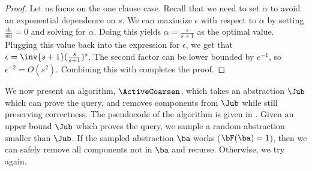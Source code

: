 \begin{proof}
Let us focus on the one clause case.
Recall that we need to set $\alpha$ to avoid an exponential dependence on $s$.
We can maximize $\epsilon$ with respect to $\alpha$
by setting $\frac{d \epsilon}{d \alpha} = 0$ and solving for $\alpha$.
Doing this yields $\alpha = \frac{s}{s+1}$ as the optimal value.
Plugging this value back into the expression for $\epsilon$, we get that
$\epsilon = \inv{s+1} (\frac{s}{s+1})^s$.
The second factor can be lower bounded by $e^{-1}$,
so $\epsilon^{-2} = O(s^2)$.
Combining this with  completes the proof.
\end{proof}

%
%


We now present an algorithm, $\ActiveCoarsen$,
which takes an abstraction $\Jub$ which can prove the query,
and removes components from $\Jub$ while still preserving correctness.
The pseudocode of the algorithm is given in .
Given an upper bound $\Jub$ which proves the
query, we sample a random abstraction smaller than $\Jub$.
If the sampled abstraction $\ba$ works ($\bF(\ba) = 1$),
then we can safely remove all components not in $\ba$
and recurse.  Otherwise, we try again.

